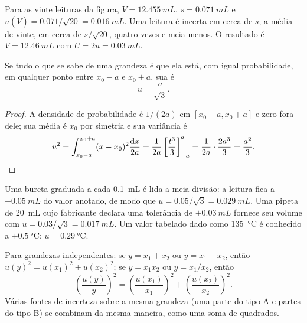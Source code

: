 \begin{example}
Para as vinte leituras da figura, $\bar V = \qty{12.455}{mL}$,
$s = \qty{0.071}{mL}$ e $u(\bar V) = 0.071/\sqrt{20} = \qty{0.016}{mL}$.
Uma leitura é incerta em cerca de $s$; a média de vinte, em cerca de
$s/\sqrt{20}$, quatro vezes e meia menos. O resultado é
$V = \qty{12.46}{mL}$ com $U = 2u = \qty{0.03}{mL}$.
\end{example}

\begin{proposition}\label{prop:b1:lab-techniques-1:type-b}
Se tudo o que se sabe de uma grandeza é que ela está, com igual
probabilidade, em qualquer ponto entre $x_0 - a$ e $x_0 + a$, sua
 é
\[
  u = \frac{a}{\sqrt3}.
\]
\end{proposition}
\begin{proof}
A densidade de probabilidade é $1/(2a)$ em $[x_0 - a, x_0 + a]$ e zero
fora dele; sua média é $x_0$ por simetria e sua variância é
\[
  u^2 = \int_{x_0-a}^{x_0+a} (x - x_0)^2 \frac{\mathrm{d}x}{2a}
      = \frac{1}{2a} \left[\frac{t^3}{3}\right]_{-a}^{a}
      = \frac{1}{2a}\cdot\frac{2a^3}{3} = \frac{a^2}{3}. \qedhere
\]
\end{proof}

\begin{example}
Uma bureta graduada a cada \qty{0.1}{mL} é lida a meia divisão: a leitura
fica a $\pm\qty{0.05}{mL}$ do valor anotado, de modo que
$u = 0.05/\sqrt3 = \qty{0.029}{mL}$. Uma pipeta de \qty{20}{mL} cujo
fabricante declara uma tolerância de $\pm\qty{0.03}{mL}$ fornece seu volume com
$u = 0.03/\sqrt3 = \qty{0.017}{mL}$. Um valor tabelado dado como
\qty{135}{\celsius} é conhecido a $\pm\qty{0.5}{\celsius}$: $u = \qty{0.29}{\celsius}$.
\end{example}

\begin{proposition}\label{prop:b1:lab-techniques-1:combine}
Para grandezas independentes: se $y = x_1 + x_2$ ou $y = x_1 - x_2$, então
$u(y)^2 = u(x_1)^2 + u(x_2)^2$; se $y = x_1 x_2$ ou $y = x_1/x_2$, então
\[
  \left(\frac{u(y)}{y}\right)^2 = \left(\frac{u(x_1)}{x_1}\right)^2
  + \left(\frac{u(x_2)}{x_2}\right)^2 .
\]
Várias fontes de incerteza sobre a mesma grandeza (uma parte do tipo A e
partes do tipo B) se combinam da mesma maneira, como uma soma de quadrados.
\end{proposition}
\admitted


